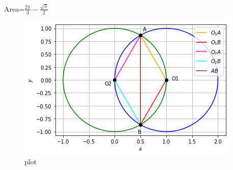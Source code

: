 \documentclass[journal,12pt,twocolumn]{IEEEtran}
\begin{document}
\begin{center}
    \huge{Area=$\frac{2\pi}{3} - \frac{\sqrt{3}}{2}$}
\end{center}

\begin{figure}[htp]
    \includegraphics[scale=0.65]{figure_assignment5.png}
    \caption{plot}
\end{figure}
\end{document}
